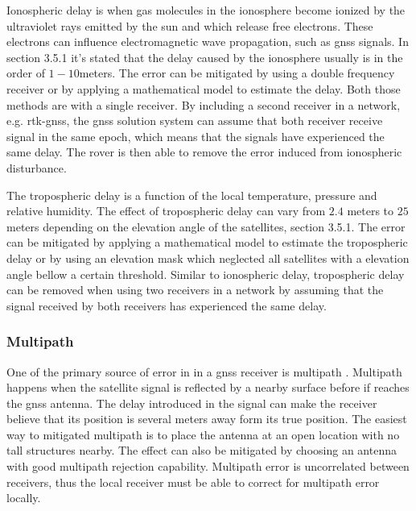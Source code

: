 Ionospheric delay is when gas molecules in the ionosphere become ionized by the ultraviolet rays emitted by the sun and which release free electrons. These electrons can influence electromagnetic wave propagation, such as \gls{gnss} signals. In \citep{vik2014integrated} section 3.5.1 it's stated that the delay caused by the ionosphere usually is in the order of $1-10 $meters. The error can be mitigated by using a double frequency receiver or by applying a mathematical model to estimate the delay. Both those methods are with a single receiver. By including a second receiver in a network, e.g. \gls{rtk-gnss}, the \gls{gnss} solution system can assume that both receiver receive signal in the same epoch, which means that the signals have experienced the same delay. The rover is then able to remove the error induced from ionospheric disturbance.

The tropospheric delay is a function of the local temperature, pressure and relative humidity. The effect of tropospheric delay can  vary from $2.4$ meters to $25$ meters depending on the elevation angle of the satellites,\citep{vik2014integrated} section 3.5.1. The error can be mitigated by applying a mathematical model to estimate the tropospheric delay or by using an elevation mask which neglected all satellites with a elevation angle bellow a certain threshold. Similar to ionospheric delay, tropospheric delay can be removed when using two receivers in a network by assuming that the signal received by both receivers has experienced the same delay. 

\subsubsection{Multipath}
One of the primary source of error in in a \gls{gnss} receiver is multipath \citep{misra2011global}. Multipath happens when the satellite signal is reflected by a nearby surface before if reaches the \gls{gnss} antenna. The delay introduced in the signal can make the receiver believe that its position is several meters away form its true position. The easiest way to mitigated multipath is to place the antenna at an open location with no tall structures nearby. The effect can also be mitigated by choosing an antenna with good multipath rejection capability. Multipath error is uncorrelated between receivers, thus the local receiver must be able to correct for multipath error locally.

